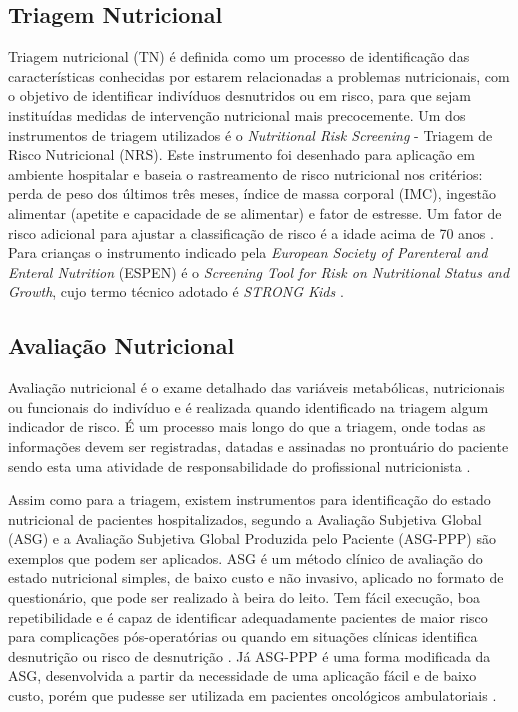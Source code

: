 \subsection{Triagem Nutricional} \label{subD-triagem}
Triagem nutricional (TN) é definida como um processo de identificação das características conhecidas por estarem relacionadas a problemas nutricionais, com o objetivo de identificar indivíduos desnutridos ou em risco, para que sejam instituídas medidas de intervenção nutricional mais precocemente. Um dos instrumentos de triagem utilizados é o \textit{Nutritional Risk Screening} - Triagem de Risco Nutricional (NRS). Este instrumento foi desenhado para aplicação em ambiente hospitalar e baseia o rastreamento de risco nutricional nos critérios: perda de peso dos últimos três meses, índice de massa corporal (IMC), ingestão alimentar (apetite e capacidade de se alimentar) e fator de estresse. Um fator de risco adicional para ajustar a classificação de risco é a idade acima de 70 anos \cite{protocolonutricionaladulto, manualnutricao2016}. Para crianças o instrumento indicado pela \textit{European Society of Parenteral and Enteral Nutrition} (ESPEN) é o \textit{Screening Tool for Risk on Nutritional Status and Growth}, cujo termo técnico adotado é \textit{STRONG Kids} \cite{protocolonutricionalinfantil}. 

\subsection{Avaliação Nutricional} \label{subD-avaliacao}
Avaliação nutricional é o exame detalhado das variáveis metabólicas, nutricionais ou funcionais do indivíduo e é realizada quando identificado na triagem algum indicador de risco. É um processo mais longo do que a triagem, onde todas as informações devem ser registradas, datadas e assinadas no prontuário do paciente sendo esta uma atividade de responsabilidade do profissional nutricionista \cite{protocolonutricionaladulto}. 

Assim como para a triagem, existem instrumentos para identificação do estado nutricional de pacientes hospitalizados, segundo  a Avaliação Subjetiva Global (ASG) e a Avaliação Subjetiva Global Produzida pelo Paciente (ASG-PPP) são exemplos que podem ser aplicados. ASG é um método clínico de avaliação do estado nutricional simples, de baixo custo e não invasivo, aplicado no formato de questionário, que pode ser realizado à beira do leito. Tem fácil execução, boa repetibilidade e é capaz de identificar adequadamente pacientes de maior risco para complicações pós-operatórias ou quando em situações clínicas identifica desnutrição ou risco de desnutrição \cite{baker1982}. Já ASG-PPP é uma forma modificada da ASG, desenvolvida a partir da necessidade de uma aplicação fácil e de baixo custo, porém que pudesse ser utilizada em pacientes oncológicos ambulatoriais \cite{ottery1996}.

